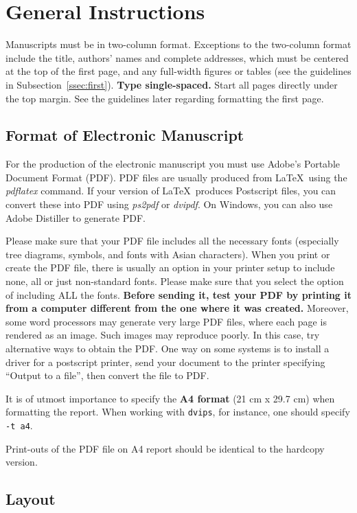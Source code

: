 \documentclass[11pt]{article}
\begin{document}
\section{General Instructions}

Manuscripts must be in two-column format.  Exceptions to the
two-column format include the title, authors' names and complete
addresses, which must be centered at the top of the first page, and
any full-width figures or tables (see the guidelines in
Subsection~\ref{ssec:first}). {\bf Type single-spaced.}  Start all
pages directly under the top margin. See the guidelines later
regarding formatting the first page.

\subsection{Format of Electronic Manuscript}
\label{sect:pdf}

For the production of the electronic manuscript you must use Adobe's
Portable Document Format (PDF). PDF files are usually produced from
\LaTeX\ using the \textit{pdflatex} command. If your version of
\LaTeX\ produces Postscript files, you can convert these into PDF
using \textit{ps2pdf} or \textit{dvipdf}. On Windows, you can also use
Adobe Distiller to generate PDF.

Please make sure that your PDF file includes all the necessary fonts
(especially tree diagrams, symbols, and fonts with Asian
characters). When you print or create the PDF file, there is usually
an option in your printer setup to include none, all or just
non-standard fonts.  Please make sure that you select the option of
including ALL the fonts. \textbf{Before sending it, test your PDF by
  printing it from a computer different from the one where it was
  created.} Moreover, some word processors may generate very large PDF
files, where each page is rendered as an image. Such images may
reproduce poorly. In this case, try alternative ways to obtain the
PDF. One way on some systems is to install a driver for a postscript
printer, send your document to the printer specifying ``Output to a
file'', then convert the file to PDF.

It is of utmost importance to specify the \textbf{A4 format} (21 cm
x 29.7 cm) when formatting the report. When working with
{\tt dvips}, for instance, one should specify {\tt -t a4}.

Print-outs of the PDF file on A4 report should be identical to the
hardcopy version.


\subsection{Layout}
\label{ssec:layout}
\end{document}
